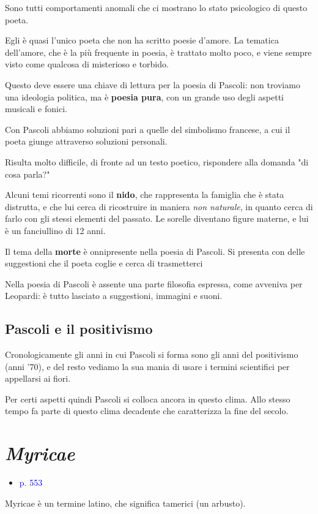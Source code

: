 \documentclass[a4paper, twoside, titlepage]{book}
\newcommand{\elenco}[1]{%
\begin{itemize}
#1
\end{itemize}}
\renewcommand{\emph}[1]{\textcolor{blue}{#1}}
\begin{document}
Sono tutti comportamenti anomali che ci mostrano lo stato psicologico di questo poeta.

Egli è quasi l'unico poeta che non ha scritto poesie d'amore. La tematica dell'amore, che è la più frequente in poesia, è trattato molto poco, e viene sempre visto come qualcosa di misterioso e torbido.

Questo deve essere una chiave di lettura per la poesia di Pascoli: non troviamo una ideologia politica, ma è \textbf{poesia pura}, con un grande uso degli aspetti musicali e fonici.

Con Pascoli abbiamo soluzioni pari a quelle del simbolismo francese, a cui il poeta giunge attraverso soluzioni personali.

Risulta molto difficile, di fronte ad un testo poetico, rispondere alla domanda "di cosa parla?"

Alcuni temi ricorrenti sono il \textbf{nido}, che rappresenta la famiglia che è stata distrutta, e che lui cerca di ricostruire in maniera \textit{non naturale}, in quanto cerca di farlo con gli stessi elementi del passato. Le sorelle diventano figure materne, e lui è un fanciullino di 12 anni.

Il tema della \textbf{morte} è onnipresente nella poesia di Pascoli. Si presenta con delle suggestioni che il poeta coglie e cerca di trasmetterci

Nella poesia di Pascoli è assente una parte filosofia espressa, come avveniva per Leopardi: è tutto lasciato a suggestioni, immagini e suoni.


\section{Pascoli e il positivismo}

Cronologicamente gli anni in cui Pascoli si forma sono gli anni del positivismo (anni '70), e del resto vediamo la sua mania di usare i termini scientifici per appellarsi ai fiori.

Per certi aspetti quindi Pascoli si colloca ancora in questo clima. Allo stesso tempo fa parte di questo clima decadente che caratterizza la fine del secolo.

\chapter{\textit{Myricae}}
\elenco{\item \emph{p. 553}}

Myricae è un termine latino, che significa tamerici (un arbusto).
\end{document}
